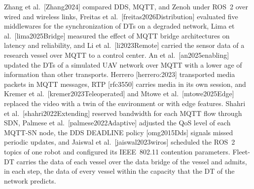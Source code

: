 Zhang et al.\ [Zhang2024] compared DDS, MQTT, and Zenoh under ROS~2 over wired and wireless links, Freitas et al.\ [freitas2026Distribution] evaluated five middlewares for the synchronization of DTs on a degraded network, Lima et al.\ [lima2025Bridge] measured the effect of MQTT bridge architectures on latency and reliability, and Li et al.\ [li2023Remote] carried the sensor data of a research vessel over MQTT to a control center. An et al.\ [an2025enabling] updated the DTs of a simulated UAV network over MQTT with a lower age of information than other transports. Herrero [herrero:2023] transported media packets in MQTT messages, RTP [rfc3550] carries media in its own session, and Kremer et al.\ [kremer2023Teleoperated] and Mtowe et al.\ [mtowe2025Edge] replaced the video with a twin of the environment or with edge features. Shahri et al.\ [shahri2022Extending] reserved bandwidth for each MQTT flow through SDN, Palmese et al.\ [palmese2022Adaptive] adjusted the QoS level of each MQTT-SN node, the DDS DEADLINE policy [omg2015Dds] signals missed periodic updates, and Jaiswal et al.\ [jaiswal2023wiros] scheduled the ROS~2 topics of one robot and configured its IEEE~802.11 contention parameters. Fleet-DT carries the data of each vessel over the data bridge of the vessel and admits, in each step, the data of every vessel within the capacity that the DT of the network predicts.

